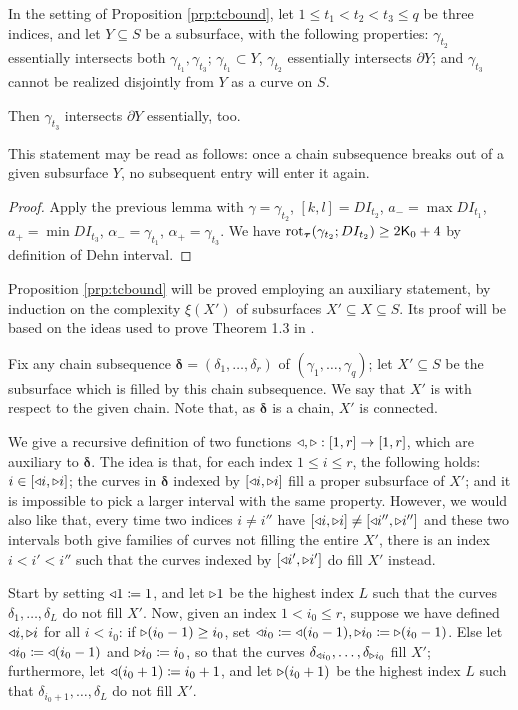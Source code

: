 \begin{coroll}\label{cor:subsurfacesdontrepeat}
In the setting of Proposition \ref{prp:tcbound}, let $1\leq t_1<t_2<t_3\leq q$ be three indices, and let $Y\subseteq S$ be a subsurface, with the following properties: $\gamma_{t_2}$ essentially intersects both $\gamma_{t_1},\gamma_{t_3}$; $\gamma_{t_1}\subset Y$, $\gamma_{t_2}$ essentially intersects $\partial Y$; and $\gamma_{t_3}$ cannot be realized disjointly from $Y$ as a curve on $S$.

Then $\gamma_{t_3}$ intersects $\partial Y$ essentially, too.
\end{coroll}
This statement may be read as follows: once a chain subsequence breaks out of a given subsurface $Y$, no subsequent entry will enter it again.
\begin{proof}
Apply the previous lemma with $\gamma=\gamma_{t_2}$,  $[k,l]=DI_{t_2}$, $a_-=\max DI_{t_1}$, $a_+=\min DI_{t_3}$, $\alpha_-=\gamma_{t_1}$, $\alpha_+=\gamma_{t_3}$. We have $\mathrm{rot}_{\bm\tau}(\gamma_{t_2};DI_{t_2})\geq 2\mathsf{K}_0+4$ by definition of Dehn interval.
\end{proof}

Proposition \ref{prp:tcbound} will be proved employing an auxiliary statement, by induction on the complexity $\xi(X')$ of subsurfaces $X'\subseteq X\subseteq S$. Its proof will be based on the ideas used to prove Theorem 1.3 in \cite{masurminskyq}.

Fix any chain subsequence $\bm\delta=(\delta_1,\ldots,\delta_r)$ of $(\gamma_1,\ldots,\gamma_q)$; let $X'\subseteq S$ be the subsurface which is filled by this chain subsequence. We say that $X'$ is  with respect to the given chain. Note that, as $\bm\delta$ is a chain, $X'$ is connected.

We give a recursive definition of two functions $\triangleleft,\triangleright:[1,r]\rightarrow [1,r]$, which are auxiliary to $\bm\delta$. The idea is that, for each index $1\leq i\leq r$, the following holds: $i\in [\triangleleft i,\triangleright i]$; the curves in $\bm\delta$ indexed by $[\triangleleft i,\triangleright i]$ fill a proper subsurface of $X'$; and it is impossible to pick a larger interval with the same property. However, we would also like that, every time two indices $i\not=i''$ have $[\triangleleft i,\triangleright i]\not= [\triangleleft i'',\triangleright i'']$ and these two intervals both give families of curves not filling the entire $X'$, there is an index $i< i'< i''$ such that the curves indexed by $[\triangleleft i',\triangleright i']$ do fill $X'$ instead.

Start by setting $\triangleleft 1\coloneqq 1$, and let $\triangleright 1$ be the highest index $L$ such that the curves $\delta_1,\ldots,\delta_L$ do not fill $X'$. Now, given an index $1<i_0\leq r$, suppose we have defined $\triangleleft i,\triangleright i$ for all $i< i_0$: if $\triangleright(i_0-1)\geq i_0$, set $\triangleleft i_0\coloneqq\triangleleft(i_0-1), \triangleright i_0\coloneqq\triangleright(i_0-1)$. Else let $\triangleleft i_0\coloneqq\triangleleft(i_0-1)$ and $\triangleright i_0\coloneqq i_0$, so that the curves $\delta_{\triangleleft i_0},\ldots,\delta_{\triangleright i_0}$ fill $X'$; furthermore, let $\triangleleft(i_0+1)\coloneqq i_0+1$, and let $\triangleright(i_0+1)$ be the highest index $L$ such that $\delta_{i_0+1},\ldots,\delta_L$ do not fill $X'$.


